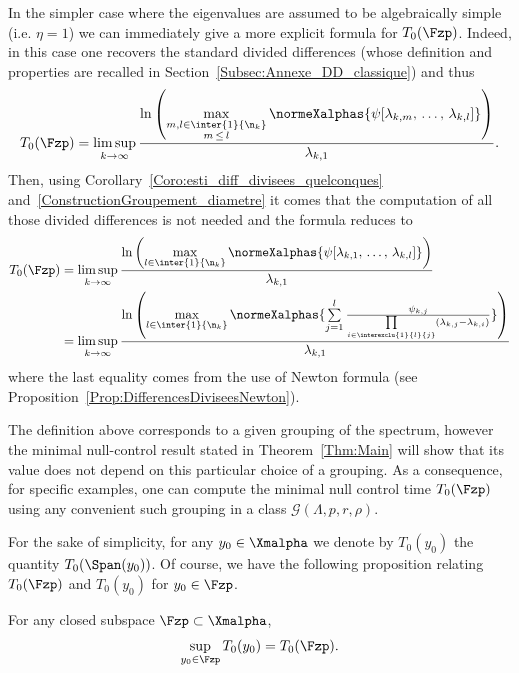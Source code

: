 In the simpler case where the eigenvalues are assumed to be algebraically simple (i.e. $\eta =1$) we can immediately give a more explicit formula for $T_0(\Fzp)$. Indeed, in this case one recovers the standard divided differences (whose definition and properties are recalled in Section~\ref{Subsec:Annexe_DD_classique}) and thus
\begin{equation}\label{Def:TempsMinimal_DifferencesDivisees_casgeneral}
T_0(\Fzp) = \limsup_{k\to \infty} \frac{\ln \left(\max\limits_{\substack{m,l\in \inter{1}{\n_k} \\ m\,\leq\,l}} \normeXalphas{ \psi[\lambda_{k,m},\,\dots,\,\lambda_{k,l}] } \right)}{\lambda_{k,1}}.
\end{equation}
Then, using Corollary~\ref{Coro:esti_diff_divisees_quelconques} and~\eqref{ConstructionGroupement_diametre} it comes that the computation of all those divided differences is not needed and the formula reduces to
\begin{align}\label{Def:TempsMinimal_DifferencesDivisees}
T_0 (\Fzp) &= \limsup_{k \to \infty} \frac{\ln \left(\max\limits_{l\in \inter{1}{\n_k}} \normeXalphas{ \psi[\lambda_{k,1},\, \dots,\,\lambda_{k,l}] } \right)}{\lambda_{k,1}}
\\
&=\limsup_{k\to \infty} \frac{\ln \left(\max\limits_{l\in \inter{1}{\n_k}} \normeXalphas{\sum\limits_{j=1}^l \frac{ \psi_{k,j} }{\prod\limits_{i\in \interexclu{1}{l}{j}} (\lambda_{k,j}-\lambda_{k,i})} } \right)}{\lambda_{k,1}}\label{Def:T0}
\end{align}
where the last equality comes from the use of Newton formula (see Proposition~\ref{Prop:DifferencesDiviseesNewton}).



\begin{rema}
The definition above corresponds to a given grouping of the spectrum, however the minimal null-control result stated in Theorem~\ref{Thm:Main} will show that its value does not depend on this particular choice of a grouping. As a consequence, for specific examples, one can compute the minimal null control time $T_0(\Fzp)$ using any convenient such grouping in a class $\mathcal{G}(\Lambda,p,r,\rho)$.
\end{rema}


For the sake of simplicity, for any $y_0 \in \Xmalpha$ we denote by $T_0(y_0)$ the quantity $T_0(\Span(y_0))$. Of course, we have the following proposition relating $T_0(\Fzp)$ and $T_0(y_0)$ for $y_0 \in \Fzp$.

\begin{prop}\label{Prop:Sup_TempsMinimaux}
For any closed subspace $\Fzp \subset \Xmalpha$,
\[
\sup_{y_0 \in \Fzp} T_0(y_0) = T_0(\Fzp).
\]
\end{prop}

